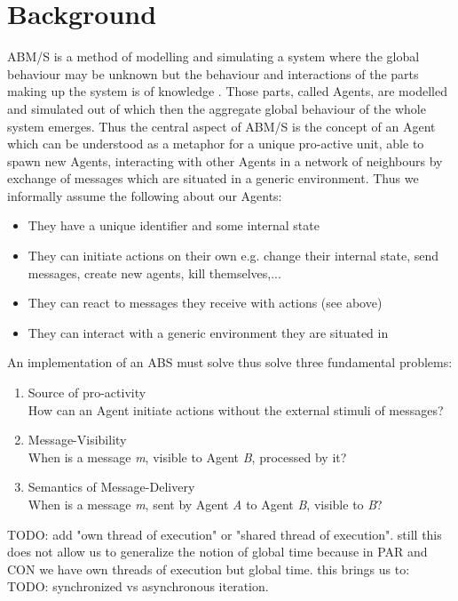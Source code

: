 \section{Background}
ABM/S is a method of modelling and simulating a system where the global behaviour may be unknown but the behaviour and interactions of the parts making up the system is of knowledge \cite{wooldridge_introduction_2009}. Those parts, called Agents, are modelled and simulated out of which then the aggregate global behaviour of the whole system emerges. Thus the central aspect of ABM/S is the concept of an Agent which can be understood as a metaphor for a unique pro-active unit, able to spawn new Agents, interacting with other Agents in a network of neighbours by exchange of messages which are situated in a generic environment. Thus we informally assume the following about our Agents:

\begin{itemize}
	\item They have a unique identifier and some internal state
	\item They can initiate actions on their own e.g. change their internal state, send messages, create new agents, kill themselves,...
	\item They can react to messages they receive with actions (see above)
	\item They can interact with a generic environment they are situated in
\end{itemize} 

An implementation of an ABS must solve thus solve three fundamental problems:
\begin{enumerate}
	\item Source of pro-activity \\ How can an Agent initiate actions without the external stimuli of messages?
	\item Message-Visibility \\ When is a message \textit{m}, visible to Agent \textit{B}, processed by it?
	\item Semantics of Message-Delivery \\ When is a message \textit{m}, sent by Agent \textit{A} to Agent \textit{B}, visible to \textit{B}?
\end{enumerate}

TODO: add "own thread of execution" or "shared thread of execution". still this does not allow us to generalize the notion of global time because in PAR and CON we have own threads of execution but global time. this brings us to:
TODO: synchronized vs asynchronous iteration. 

